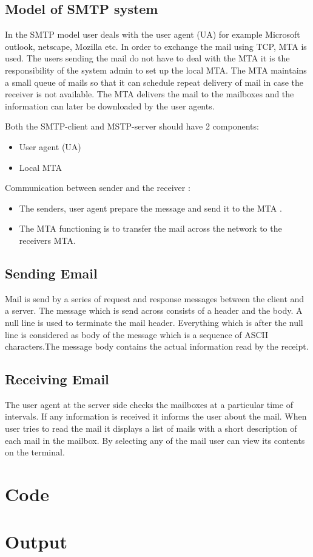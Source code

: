 \documentclass[a4paper,12pt]{article}
\begin{document}
\subsection{Model of SMTP system}



In the SMTP model user deals with the user agent (UA) for example Microsoft outlook, netscape, Mozilla etc. 
In order to exchange the mail using TCP, MTA is used. The users sending the mail do not have to deal with the 
MTA it is the responsibility of the system admin to set up the local MTA. The MTA maintains a small queue of mails
so that it can schedule repeat delivery of mail in case the receiver is not available. The MTA delivers the mail
to the mailboxes and the information can later be downloaded by the user agents.

Both the SMTP-client and MSTP-server should have 2 components:
\begin{itemize}
\item User agent (UA)
\item Local MTA  
\end{itemize}


Communication between sender and the receiver :
\begin{itemize}
\item The senders, user agent prepare the message and send it to the MTA . 

\item The MTA functioning is to transfer the mail across the network to the receivers MTA.
  
\end{itemize}


\subsection{Sending Email}

Mail is send by a series of request and response messages between the client and a server. 
The message which is send across consists of a header and the body. A null line is used to terminate the mail
 header. Everything which is after the null line is considered as body of the message which is a sequence of ASCII
  characters.The message body contains the actual information read by the receipt.

\subsection{Receiving Email}

The user agent at the server side checks the mailboxes at a particular time of intervals. 
If any information is received it informs the user about the mail. When user tries to read the mail it displays a 
list of mails with a short description of each mail in the mailbox. By selecting any of the mail user can view
its contents on the terminal.

\section{Code}

\section{Output}
\end{document}

